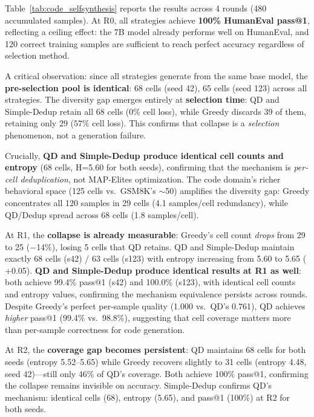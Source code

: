 \documentclass{article}
\begin{document}
\begin{enumerate}[nosep]
Table~\ref{tab:code_selfsynthesis} reports the results across 4 rounds (480 accumulated samples). At R0, all strategies achieve \textbf{100\% HumanEval pass@1}, reflecting a ceiling effect: the 7B model already performs well on HumanEval, and 120 correct training samples are sufficient to reach perfect accuracy regardless of selection method.

A critical observation: since all strategies generate from the same base model, the \textbf{pre-selection pool is identical}: 68 cells (seed 42), 65 cells (seed 123) across all strategies.
The diversity gap emerges entirely at \textbf{selection time}: QD and Simple-Dedup retain all 68 cells ($0\%$ cell loss), while Greedy discards 39 of them, retaining only 29 ($57\%$ cell loss).
This confirms that collapse is a \emph{selection} phenomenon, not a generation failure.

Crucially, \textbf{QD and Simple-Dedup produce identical cell counts and entropy} (68 cells, H=5.60 for both seeds), confirming that the mechanism is \emph{per-cell deduplication}, not MAP-Elites optimization.
The code domain's richer behavioral space (125 cells vs.\ GSM8K's $\sim$50) amplifies the diversity gap: Greedy concentrates all 120 samples in 29 cells (4.1 samples/cell redundancy), while QD/Dedup spread across 68 cells (1.8 samples/cell).

At R1, the \textbf{collapse is already measurable}: Greedy's cell count \emph{drops} from 29 to 25 ($-$14\%), losing 5 cells that QD retains.
QD and Simple-Dedup maintain exactly 68 cells (s42) / 63 cells (s123) with entropy increasing from 5.60 to 5.65 ($+$0.05).
\textbf{QD and Simple-Dedup produce identical results at R1 as well}: both achieve 99.4\% pass@1 (s42) and 100.0\% (s123), with identical cell counts and entropy values, confirming the mechanism equivalence persists across rounds.
Despite Greedy's perfect per-sample quality (1.000 vs.\ QD's 0.761), QD achieves \emph{higher} pass@1 (99.4\% vs.\ 98.8\%), suggesting that cell coverage matters more than per-sample correctness for code generation.

At R2, the \textbf{coverage gap becomes persistent}: QD maintains 68 cells for both seeds (entropy 5.52--5.65) while Greedy recovers slightly to 31 cells (entropy 4.48, seed 42)---still only 46\% of QD's coverage.
Both achieve 100\% pass@1, confirming the collapse remains invisible on accuracy.
Simple-Dedup confirms QD's mechanism: identical cells (68), entropy (5.65), and pass@1 (100\%) at R2 for both seeds.


\end{enumerate}
\end{document}
